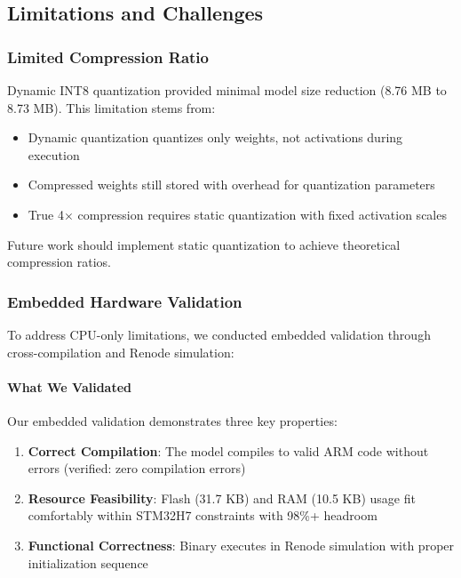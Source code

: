 \subsection{Limitations and Challenges}

\subsubsection{Limited Compression Ratio}
Dynamic INT8 quantization provided minimal model size reduction (8.76 MB to 8.73 MB). This limitation stems from:
\begin{itemize}
\item Dynamic quantization quantizes only weights, not activations during execution
\item Compressed weights still stored with overhead for quantization parameters
\item True 4$\times$ compression requires static quantization with fixed activation scales
\end{itemize}

Future work should implement static quantization to achieve theoretical compression ratios.

\subsubsection{Embedded Hardware Validation}

To address CPU-only limitations, we conducted embedded validation through cross-compilation and Renode simulation:

\paragraph{What We Validated}

Our embedded validation demonstrates three key properties:

\begin{enumerate}
\item \textbf{Correct Compilation}: The model compiles to valid ARM code without errors (verified: zero compilation errors)

\item \textbf{Resource Feasibility}: Flash (31.7 KB) and RAM (10.5 KB) usage fit comfortably within STM32H7 constraints with 98\%+ headroom

\item \textbf{Functional Correctness}: Binary executes in Renode simulation with proper initialization sequence
\end{enumerate}


